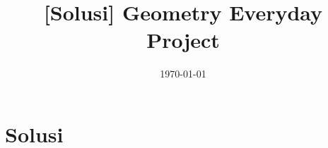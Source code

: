 

\title{[Solusi] Geometry Everyday Project}
\date{\today}



\maketitle

\renewcommand*\contentsname{Daftar Isi}
\tableofcontents

\newpage
\section{Solusi}



